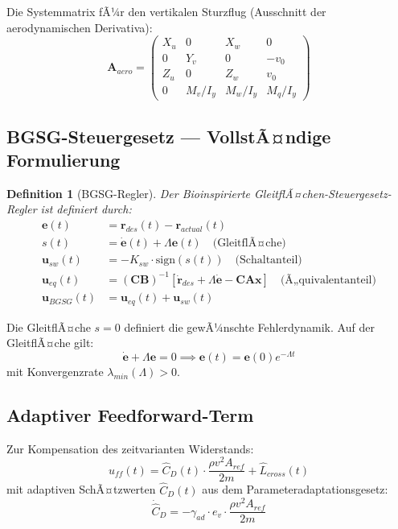 ﻿\documentclass[12pt,a4paper]{article}
\newtheorem{definition}{Definition}[section]
\theoremstyle{remark}
\begin{document}
	Die Systemmatrix fÃ¼r den vertikalen Sturzflug (Ausschnitt der aerodynamischen Derivativa):
	\begin{equation}
		\mathbf{A}_{aero} = \begin{pmatrix}
			X_u & 0 & X_w & 0 \\
			0 & Y_v & 0 & -v_0 \\
			Z_u & 0 & Z_w & v_0 \\
			0 & M_v/I_y & M_w/I_y & M_q/I_y
		\end{pmatrix}
	\end{equation}
	
	\subsection{BGSG-Steuergesetz --- VollstÃ¤ndige Formulierung}
	
	\begin{definition}[BGSG-Regler]
		Der Bioinspirierte GleitflÃ¤chen-Steuergesetz-Regler ist definiert durch:
		\begin{align}
			\mathbf{e}(t) &= \mathbf{r}_{des}(t) - \mathbf{r}_{actual}(t) \\
			s(t) &= \dot{\mathbf{e}}(t) + \Lambda \mathbf{e}(t) \quad \text{(GleitflÃ¤che)} \\
			\mathbf{u}_{sw}(t) &= -K_{sw} \cdot \text{sign}(s(t)) \quad \text{(Schaltanteil)} \\
			\mathbf{u}_{eq}(t) &= (\mathbf{CB})^{-1}\left[\dot{\mathbf{r}}_{des} + \Lambda\dot{\mathbf{e}} - \mathbf{CA}\mathbf{x}\right] \quad \text{(Ã„quivalentanteil)} \\
			\mathbf{u}_{BGSG}(t) &= \mathbf{u}_{eq}(t) + \mathbf{u}_{sw}(t)
		\end{align}
	\end{definition}
	
	Die GleitflÃ¤che $s = 0$ definiert die gewÃ¼nschte Fehlerdynamik. Auf der GleitflÃ¤che gilt:
	\begin{equation}
		\dot{\mathbf{e}} + \Lambda\mathbf{e} = 0 \implies \mathbf{e}(t) = \mathbf{e}(0) e^{-\Lambda t}
	\end{equation}
	mit Konvergenzrate $\lambda_{min}(\Lambda) > 0$.
	
	\subsection{Adaptiver Feedforward-Term}
	
	Zur Kompensation des zeitvarianten Widerstands:
	\begin{equation}
		u_{ff}(t) = \hat{C}_D(t) \cdot \frac{\rho v^2 A_{ref}}{2m} + \hat{L}_{cross}(t)
	\end{equation}
	mit adaptiven SchÃ¤tzwerten $\hat{C}_D(t)$ aus dem Parameteradaptationsgesetz:
	\begin{equation}
		\dot{\hat{C}}_D = -\gamma_{ad} \cdot e_v \cdot \frac{\rho v^2 A_{ref}}{2m}
	\end{equation}
	
\end{document}
